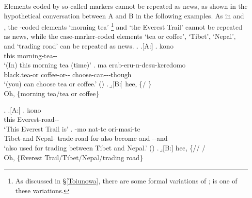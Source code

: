 Elements coded by so-called  markers cannot be repeated as news, as shown in the hypothetical conversation between A and B in the following examples.
%
%		
As in \Next and \NNext,
the -coded elements
 `morning tea'%
	\footnote{
	As discussed in \S \ref{Toiunowa},
	there are some formal variations of ;
	 is one of these variations.
	}
and  `the Everest Trail'
cannot be repeated as news,
while the case-marker-coded elements  `tea or coffee',  `Tibet',  `Nepal', and  `trading road'
can be repeated as news.
%
	\ex. \a.[A:] \ag. kono  \\
			this morning-tea-- \\
			`(In) this morning tea (time)'
		\bg. ma   erab-eru-n-desu-keredomo \\
			 black.tea-or coffee-or-- choose-can---though \\
			`(you) can choose tea or coffee.'
			 \hfill{()}
		\z.	
	\b.[B:] hee, \{/ \}\\
			Oh, \{morning tea/tea or coffee\}
	

%
	\ex. \a.[A:] \ag. kono  \\
			this Everest-road-- \\
			`This Everest Trail is'
		\bg.   -mo nat-te ori-masi-te \\
			Tibet-and Nepal- trade-road-for-also  become-and \ab{plt}--and \\
			`also used for trading between Tibet and Nepal.'
			 \hfill{()}
		\z.
	\b.[B:] hee, \{// / \\
			Oh, \{Everest Trail/Tibet/Nepal/trading road\}
	


